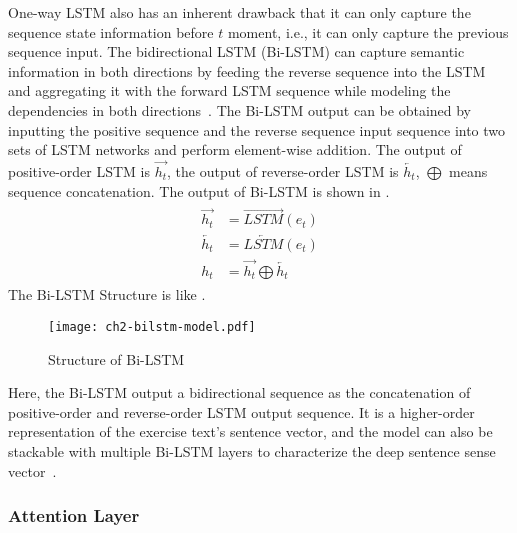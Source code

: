 One-way LSTM also has an inherent drawback that it can only capture the sequence state information before \(t\) moment, i.e., it can only capture the previous sequence input. The bidirectional LSTM (Bi-LSTM) can capture semantic information in both directions by feeding the reverse sequence into the LSTM and aggregating it with the forward LSTM sequence while modeling the dependencies in both directions~\cite{liu2019bidirectional}. The Bi-LSTM output can be obtained by inputting the positive sequence and the reverse sequence input sequence into two sets of LSTM networks and perform element-wise addition. The output of positive-order LSTM is \(\overrightarrow{h_t}\), the output of reverse-order LSTM is \(\overleftarrow{h_t}\), \(\bigoplus \) means sequence concatenation. The output of Bi-LSTM is shown in \figname{\ref{fml:ch2-bilstm-output}}.
\begin{align}\label{fml:ch2-bilstm-output}
    \begin{split}
        \overrightarrow{h_t} & = \overrightarrow{LSTM}(e_t)                       \\
        \overleftarrow{h_t}  & = \overleftarrow{LSTM}(e_t)                        \\
        h_t                  & =\overrightarrow{h_t}\bigoplus \overleftarrow{h_t}
    \end{split}
\end{align}
The Bi-LSTM Structure is like \figname{\ref{fig:ch2-model-bilstm}}.

\begin{figure}[htb]
    \centering
    \texttt{[image: ch2-bilstm-model.pdf]}
    \caption{Structure of Bi-LSTM}\label{fig:ch2-model-bilstm}
\end{figure}

Here, the Bi-LSTM output a bidirectional sequence as the concatenation of positive-order and reverse-order LSTM output sequence. It is a higher-order representation of the exercise text's sentence vector, and the model can also be stackable with multiple Bi-LSTM layers to characterize the deep sentence sense vector~\cite{jang2020bi}.



\subsubsection{Attention Layer}

